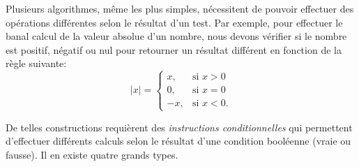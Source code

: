 Plusieurs algorithmes, même les plus simples, nécessitent de pouvoir
effectuer des opérations différentes selon le résultat d'un test. Par
exemple, pour effectuer le banal calcul de la valeur absolue d'un
nombre, nous devons vérifier si le nombre est positif, négatif ou nul
pour retourner un résultat différent en fonction de la règle suivante:
\begin{equation*}
  \lvert x \rvert =
  \begin{cases}
    x, & \text{si } x > 0 \\
    0, & \text{si } x = 0 \\
    -x, & \text{si } x < 0.
  \end{cases}
\end{equation*}

De telles constructions requièrent des \emph{instructions
  conditionnelles} qui permettent d'effectuer différents calculs selon
le résultat d'une condition booléenne (vraie ou fausse). Il en existe
quatre grands types.

